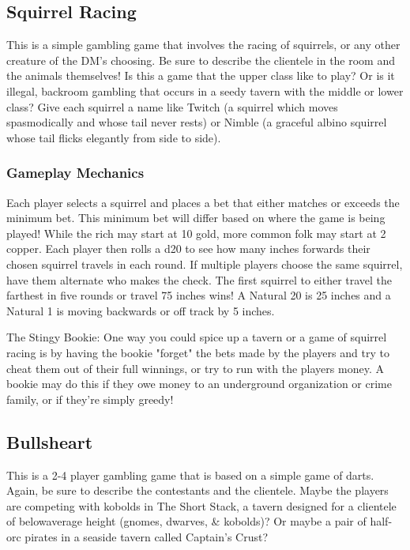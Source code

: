 \documentclass[10pt,a4paper,twoside,twocolumn,openany,nodeprecatedcode]{dndarticle}
\begin{document}
\subsection{Squirrel Racing}
This is a simple gambling game that involves the racing of squirrels, or any other creature of the DM's choosing. Be sure to describe the clientele in the room and the animals themselves! Is this a game that the upper class like to play? Or is it illegal, backroom gambling that occurs in a seedy tavern with the middle or lower class?
Give each squirrel a name like Twitch (a squirrel which moves spasmodically and whose tail never rests) or Nimble (a graceful albino squirrel whose tail flicks elegantly from side to side).
\subsubsection{Gameplay Mechanics}
Each player selects a squirrel and places a bet that either matches or exceeds the minimum bet. This minimum bet will differ based on where the game is being played! While the rich may start at 10 gold, more common folk may start at 2 copper. Each player then rolls a d20 to see how many inches forwards their chosen squirrel travels in each round. If multiple players choose the same squirrel, have them alternate who makes the check.
The first squirrel to either travel the farthest in five rounds or travel 75 inches wins! A Natural 20 is 25 inches and a Natural 1 is moving backwards or off track by 5 inches.
\begin{DndComment}{The Stingy Bookie:}
One way you could spice up a tavern or a game of squirrel racing is by having the bookie "forget" the bets made by the players and try to cheat them out of their full winnings, or try to run with the players money. A bookie may do this if they owe money to an underground organization or crime family, or if they're simply greedy!
\end{DndComment}

\subsection{Bullsheart}
 This is a 2-4 player gambling game that is based on a simple game of darts. Again, be sure to describe the contestants and the clientele. Maybe the players are competing with kobolds in The Short Stack, a tavern designed for a clientele of belowaverage height (gnomes, dwarves, \& kobolds)? Or maybe a pair of half-orc pirates in a seaside tavern called Captain's Crust?
\end{document}
